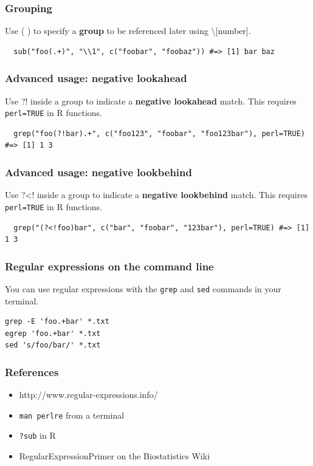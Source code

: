 \documentclass{beamer}
\begin{document}
\begin{frame}[fragile]
  \frametitle{Grouping}
  Use ( ) to specify a \textbf{group} to be referenced later using \textbackslash [number].
  \vspace{3mm}

\begin{verbatim}
  sub("foo(.+)", "\\1", c("foobar", "foobaz")) #=> [1] bar baz
\end{verbatim}
\end{frame}
\begin{frame}[fragile]
  \frametitle{Advanced usage: negative lookahead}
  Use ?! inside a group to indicate a \textbf{negative lookahead} match. This requires \texttt{perl=TRUE} in R functions.
  \vspace{3mm}

\begin{verbatim}
  grep("foo(?!bar).+", c("foo123", "foobar", "foo123bar"), perl=TRUE) #=> [1] 1 3
\end{verbatim}
\end{frame}
\begin{frame}[fragile]
  \frametitle{Advanced usage: negative lookbehind}
  Use ?<! inside a group to indicate a \textbf{negative lookbehind} match. This requires \texttt{perl=TRUE} in R functions.
  \vspace{3mm}

\begin{verbatim}
  grep("(?<!foo)bar", c("bar", "foobar", "123bar"), perl=TRUE) #=> [1] 1 3
\end{verbatim}
\end{frame}
\begin{frame}[fragile]
  \frametitle{Regular expressions on the command line}
  You can use regular expressions with the \texttt{grep} and \texttt{sed} commands in your terminal.
  \vspace{3mm}

\begin{verbatim}
grep -E 'foo.+bar' *.txt
egrep 'foo.+bar' *.txt
sed 's/foo/bar/' *.txt
\end{verbatim}
\end{frame}
\begin{frame}
  \frametitle{References}
  \begin{itemize}
    \item http://www.regular-expressions.info/
    \item \texttt{man perlre} from a terminal
    \item \texttt{?sub} in R
    \item RegularExpressionPrimer on the Biostatistics Wiki
  \end{itemize}
\end{frame}
\end{document}
